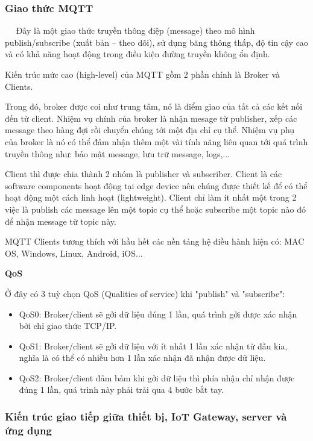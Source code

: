 \documentclass[a4paper]{article}
\begin{document}
\subsubsection{Giao thức MQTT}

$\quad$
Đây là một giao thức truyền thông điệp (message) theo mô hình publish/subscribe (xuất bản – theo dõi), sử dụng băng thông thấp, độ tin cậy cao và có khả năng hoạt động trong điều kiện đường truyền không ổn định.

Kiến trúc mức cao (high-level) của MQTT gồm 2 phần chính là Broker và Clients.

Trong đó, broker được coi như trung tâm, nó là điểm giao của tất cả các kết nối đến từ client. Nhiệm vụ chính của broker là nhận mesage từ publisher, xếp các message theo hàng đợi rồi chuyển chúng tới một địa chỉ cụ thể. Nhiệm vụ phụ của broker là nó có thể đảm nhận thêm một vài tính năng liên quan tới quá trình truyền thông như: bảo mật message, lưu trữ message, logs,...

Client thì được chia thành 2 nhóm là publisher và subscriber. Client là các software components hoạt động tại edge device  nên chúng được thiết kế để có thể hoạt động một cách linh hoạt (lightweight). Client chỉ làm ít nhất một trong 2 việc là publish các message lên một topic cụ thể hoặc subscribe một topic nào đó để nhận message từ topic này.

MQTT Clients tương thích với hầu hết các nền tảng hệ điều hành hiện có: MAC OS, Windows, Linux, Android, iOS...

\newpage
\textbf{QoS}

Ở đây có 3 tuỳ chọn QoS (Qualities of service) khi "publish" và "subscribe":
\begin{center}
	\begin{itemize}
	\item QoS0: Broker/client sẽ gởi dữ liệu đúng 1 lần, quá trình gởi được xác nhận bởi chỉ giao thức TCP/IP.
	\item QoS1: Broker/client sẽ gởi dữ liệu với ít nhất 1 lần xác nhận từ đầu kia, nghĩa là có thể có nhiều hơn 1 lần xác nhận đã nhận được dữ liệu.
	\item QoS2: Broker/client đảm bảm khi gởi dữ liệu thì phía nhận chỉ nhận được đúng 1 lần, quá trình này phải trải qua 4 bước bắt tay.
	\end{itemize}
\end{center}

\subsubsection{Kiến trúc giao tiếp giữa thiết bị, IoT Gateway, server và ứng dụng}
\end{document}
